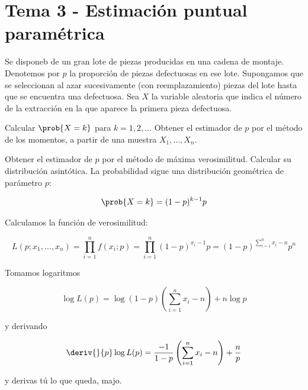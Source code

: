 \section{Tema 3 - Estimación puntual paramétrica}

\begin{problem}[3] Se disponeb de un gran lote de piezas producidas en una cadena de montaje. Denotemos por $p$ la proporción de piezas defectuosas en ese lote. Supongamos que se seleccionan al azar sucesivamente (con reemplazamiento) piezas del lote hasta que se encuentra una defectuosa. Sea $X$ la variable aleatoria que indica el número de la extracción en la que aparece la primera pieza defectuosa.

\ppart Calcular $\prob{X=k}$ para $k=1,2,\dotsc$ Obtener el estimador de $p$ por el método de los momentos, a partir de una muestra $X_1,\dotsc , X_n$.

\ppart Obtener el estimador de $p$ por el método de máxima verosimilitud. Calcular su distribución asintótica.
\solution
\spart
La probabilidad sigue una distribución geométrica de parámetro $p$:

\[ \prob{X=k} = (1-p)^{k-1}p \]

\spart Calculamos la función de verosimilitud:

\[ L(p;x_1,\dotsc,x_n) = \prod_{i=1}^n f(x_i;p) = \prod_{i=1}^n (1-p)^{x_i -1}p = (1-p)^{\sum_{i=1}^n x_i -n} p^n \]

Tomamos logaritmos

\[ \log L(p) = \log(1-p) \left(\sum_{i=1}^n x_i -n\right) + n\log p \]

y derivando

\[ \deriv{}{p} \log L(p) = \frac{-1}{1-p} \left(\sum_{i=1}^n x_i -n\right)  + \frac{n}{p} \] 

y derivas tú lo que queda, majo.
\end{problem}


